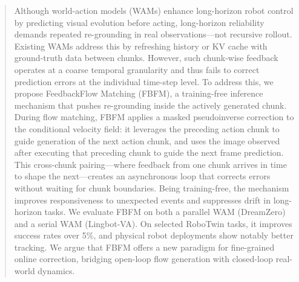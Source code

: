 

\begin{abstract}
Although world-action models (WAMs) enhance long-horizon robot control by
predicting visual evolution before acting, long-horizon reliability demands
repeated re-grounding in real observations---not recursive rollout. Existing WAMs
address this by refreshing history or KV cache with ground-truth data between
chunks. However, such chunk-wise feedback operates at a coarse temporal
granularity and thus fails to correct prediction errors at the individual
time-step level. To address this, we propose FeedbackFlow Matching (FBFM), a
training-free inference mechanism that pushes re-grounding inside the actively
generated chunk. During flow matching, FBFM applies a masked pseudoinverse
correction to the conditional velocity field: it leverages the preceding action
chunk to guide generation of the next action chunk, and uses the image observed
after executing that preceding chunk to guide the next frame prediction. This
cross-chunk pairing---where feedback from one chunk arrives in time to shape the
next---creates an asynchronous loop that corrects errors without waiting for
chunk boundaries. Being training-free, the mechanism improves responsiveness to
unexpected events and suppresses drift in long-horizon tasks. We evaluate FBFM
on both a parallel WAM (DreamZero) and a serial WAM (Lingbot-VA). On selected
RoboTwin tasks, it improves success rates over 5\%, and physical robot deployments
show notably better tracking. We argue that FBFM offers a new paradigm for
fine-grained online correction, bridging open-loop flow generation with
closed-loop real-world dynamics.
\end{abstract}
